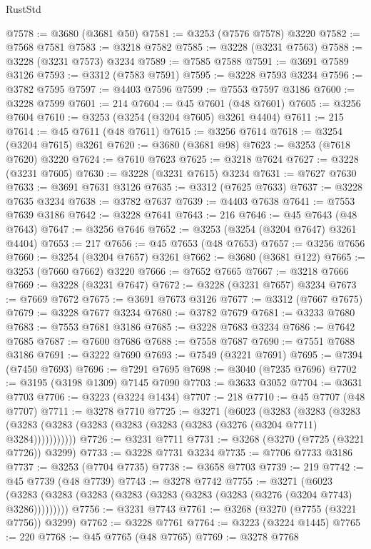 \begin{lexlean}{RustStd}
\begin{coremodule}
@7578 := @3680 (@3681 @50)
@7581 := @3253 (@7576 @7578) @3220
@7582 := @7568 @7581
@7583 := @3218 @7582
@7585 := @3228 (@3231 @7563)
@7588 := @3228 (@3231 @7573) @3234
@7589 := @7585 @7588
@7591 := @3691 @7589 @3126
@7593 := @3312 (@7583 @7591)
@7595 := @3228 @7593 @3234
@7596 := @3782 @7595
@7597 := @4403 @7596
@7599 := @7553 @7597 @3186
@7600 := @3228 @7599
@7601 := 214
@7604 := @45 @7601 (@48 @7601)
@7605 := @3256 @7604
@7610 := @3253 (@3254 (@3204 @7605) @3261 @4404)
@7611 := 215
@7614 := @45 @7611 (@48 @7611)
@7615 := @3256 @7614
@7618 := @3254 (@3204 @7615) @3261
@7620 := @3680 (@3681 @98)
@7623 := @3253 (@7618 @7620) @3220
@7624 := @7610 @7623
@7625 := @3218 @7624
@7627 := @3228 (@3231 @7605)
@7630 := @3228 (@3231 @7615) @3234
@7631 := @7627 @7630
@7633 := @3691 @7631 @3126
@7635 := @3312 (@7625 @7633)
@7637 := @3228 @7635 @3234
@7638 := @3782 @7637
@7639 := @4403 @7638
@7641 := @7553 @7639 @3186
@7642 := @3228 @7641
@7643 := 216
@7646 := @45 @7643 (@48 @7643)
@7647 := @3256 @7646
@7652 := @3253 (@3254 (@3204 @7647) @3261 @4404)
@7653 := 217
@7656 := @45 @7653 (@48 @7653)
@7657 := @3256 @7656
@7660 := @3254 (@3204 @7657) @3261
@7662 := @3680 (@3681 @122)
@7665 := @3253 (@7660 @7662) @3220
@7666 := @7652 @7665
@7667 := @3218 @7666
@7669 := @3228 (@3231 @7647)
@7672 := @3228 (@3231 @7657) @3234
@7673 := @7669 @7672
@7675 := @3691 @7673 @3126
@7677 := @3312 (@7667 @7675)
@7679 := @3228 @7677 @3234
@7680 := @3782 @7679
@7681 := @3233 @7680
@7683 := @7553 @7681 @3186
@7685 := @3228 @7683 @3234
@7686 := @7642 @7685
@7687 := @7600 @7686
@7688 := @7558 @7687
@7690 := @7551 @7688 @3186
@7691 := @3222 @7690
@7693 := @7549 (@3221 @7691)
@7695 := @7394 (@7450 @7693)
@7696 := @7291 @7695
@7698 := @3040 (@7235 @7696)
@7702 := @3195 (@3198 @1309) @7145 @7090
@7703 := @3633 @3052
@7704 := @3631 @7703
@7706 := @3223 (@3224 @1434)
@7707 := 218
@7710 := @45 @7707 (@48 @7707)
@7711 := @3278 @7710
@7725 := @3271
    (@6023
      (@3283
        (@3283
          (@3283 (@3283 (@3283 (@3283 (@3283 (@3283 (@3283 (@3276 (@3204 @7711) @3284)))))))))))
@7726 := @3231 @7711
@7731 := @3268 (@3270 (@7725 (@3221 @7726)) @3299)
@7733 := @3228 @7731 @3234
@7735 := @7706 @7733 @3186
@7737 := @3253 (@7704 @7735)
@7738 := @3658 @7703
@7739 := 219
@7742 := @45 @7739 (@48 @7739)
@7743 := @3278 @7742
@7755 := @3271
    (@6023 (@3283 (@3283 (@3283 (@3283 (@3283 (@3283 (@3283 (@3276 (@3204 @7743) @3286)))))))))
@7756 := @3231 @7743
@7761 := @3268 (@3270 (@7755 (@3221 @7756)) @3299)
@7762 := @3228 @7761
@7764 := @3223 (@3224 @1445)
@7765 := 220
@7768 := @45 @7765 (@48 @7765)
@7769 := @3278 @7768

\end{coremodule}
\end{lexlean}
